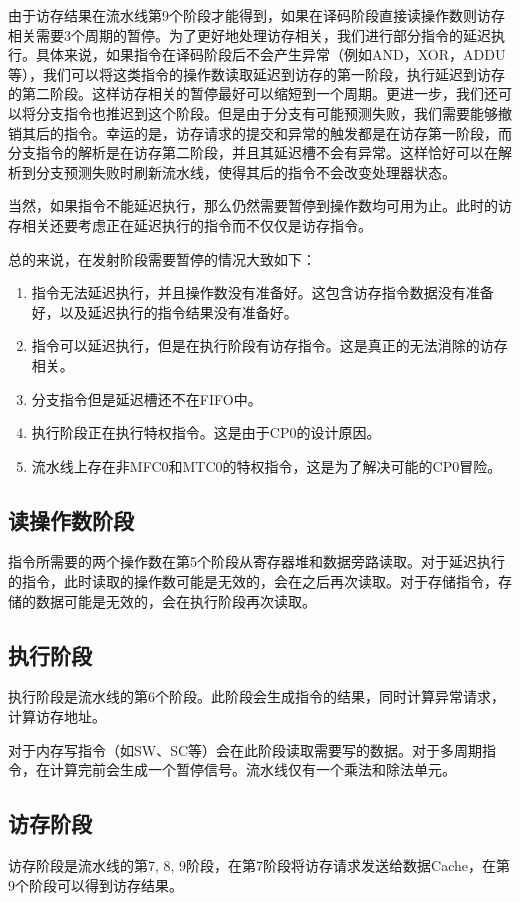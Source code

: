 由于访存结果在流水线第9个阶段才能得到，如果在译码阶段直接读操作数则访存相关需要3个周期的暂停。为了更好地处理访存相关，我们进行部分指令的延迟执行。具体来说，如果指令在译码阶段后不会产生异常（例如AND，XOR，ADDU等），我们可以将这类指令的操作数读取延迟到访存的第一阶段，执行延迟到访存的第二阶段。这样访存相关的暂停最好可以缩短到一个周期。更进一步，我们还可以将分支指令也推迟到这个阶段。但是由于分支有可能预测失败，我们需要能够撤销其后的指令。幸运的是，访存请求的提交和异常的触发都是在访存第一阶段，而分支指令的解析是在访存第二阶段，并且其延迟槽不会有异常。这样恰好可以在解析到分支预测失败时刷新流水线，使得其后的指令不会改变处理器状态。

当然，如果指令不能延迟执行，那么仍然需要暂停到操作数均可用为止。此时的访存相关还要考虑正在延迟执行的指令而不仅仅是访存指令。

总的来说，在发射阶段需要暂停的情况大致如下：
\begin{enumerate}
    \item 指令无法延迟执行，并且操作数没有准备好。这包含访存指令数据没有准备好，以及延迟执行的指令结果没有准备好。
    \item 指令可以延迟执行，但是在执行阶段有访存指令。这是真正的无法消除的访存相关。
    \item 分支指令但是延迟槽还不在FIFO中。
    \item 执行阶段正在执行特权指令。这是由于CP0的设计原因。
    \item 流水线上存在非MFC0和MTC0的特权指令，这是为了解决可能的CP0冒险。
\end{enumerate}

\subsection{读操作数阶段}
指令所需要的两个操作数在第5个阶段从寄存器堆和数据旁路读取。对于延迟执行的指令，此时读取的操作数可能是无效的，会在之后再次读取。对于存储指令，存储的数据可能是无效的，会在执行阶段再次读取。

\subsection{执行阶段}
执行阶段是流水线的第6个阶段。此阶段会生成指令的结果，同时计算异常请求，计算访存地址。

对于内存写指令（如SW、SC等）会在此阶段读取需要写的数据。对于多周期指令，在计算完前会生成一个暂停信号。流水线仅有一个乘法和除法单元。

\subsection{访存阶段}
访存阶段是流水线的第7, 8, 9阶段，在第7阶段将访存请求发送给数据Cache，在第9个阶段可以得到访存结果。

